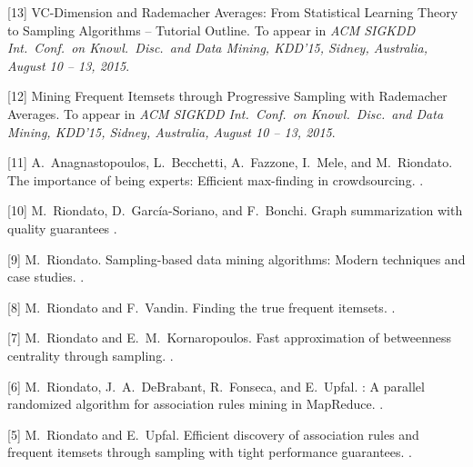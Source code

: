 \documentclass[margin,line]{resume}
\begin{document}
[13] \newblock VC-Dimension and Rademacher Averages: From Statistical Learning
Theory to Sampling Algorithms -- Tutorial Outline.
\newblock To appear in {\em ACM SIGKDD Int.~Conf.~on Knowl.~Disc.~and
Data Mining, KDD'15, Sidney, Australia, August 10 -- 13, 2015}.

[12] \newblock Mining Frequent Itemsets through Progressive Sampling with
Rademacher Averages.
\newblock To appear in {\em ACM SIGKDD Int.~Conf.~on Knowl.~Disc.~and Data
Mining, KDD'15, Sidney, Australia, August 10 -- 13, 2015}.

[11] A.~Anagnastopoulos, L.~Becchetti, A.~Fazzone, I.~Mele, and M.~Riondato.
\newblock The importance of being experts: Efficient max-finding in
crowdsourcing.
.

[10] M.~Riondato, D.~Garc\'ia-Soriano, and F.~Bonchi.
\newblock Graph summarization with quality guarantees
.

[9] M.~Riondato.
\newblock Sampling-based data mining algorithms: Modern techniques and case
  studies.
.

[8] M.~Riondato and F.~Vandin.
\newblock Finding the true frequent itemsets.
.

[7] M.~Riondato and E.~M.~Kornaropoulos.
\newblock Fast approximation of betweenness centrality through sampling.
.

[6] M.~Riondato, J.~A.~DeBrabant, R.~Fonseca, and E.~Upfal.
: A parallel randomized algorithm for association rules mining
  in {MapReduce}.
.

[5] M.~Riondato and E.~Upfal.
\newblock Efficient discovery of association rules and frequent itemsets
  through sampling with tight performance guarantees.
.
\end{document}
